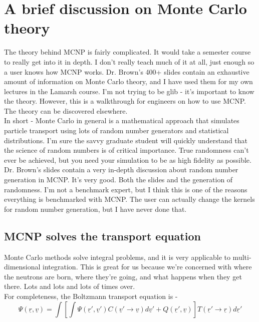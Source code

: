 \documentclass[11pt,a4paper]{article}
\begin{document}
\newpage


\section{A brief discussion on Monte Carlo theory}
\noindent The theory behind MCNP is fairly complicated. It would take a semester course to really get into it in depth. I don't really teach much of it at all, just enough so a user knows how MCNP works. Dr. Brown's 400+ slides contain an exhaustive amount of information on Monte Carlo theory, and I have used them for my own lectures in the Lamarsh course. I'm not trying to be glib - it's important to know the theory. However, this is a walkthrough for engineers on how to use MCNP. The theory can be discovered elsewhere.\\

\noindent In short - Monte Carlo in general is a mathematical approach that simulates particle transport using lots of random number generators and statistical distributions. I'm sure the savvy graduate student will quickly understand that the science of random numbers is of critical importance. True randomness can't ever be achieved, but you need your simulation to be as high fidelity as possible. Dr. Brown's slides contain a very in-depth discussion about random number generation in MCNP. It's
very good. Both the slides and the generation of randomness. I'm not a benchmark expert, but I think this is one of the reasons everything is benchmarked with MCNP. The user can actually change the kernels for random number generation, but I have never done that. 

\subsection{MCNP solves the transport equation}
\noindent Monte Carlo methods solve integral problems, and it is very applicable to multi-dimensional integration. This is great for us because we're concerned with where the neutrons are born, where they're going, and what happens when they get there. Lots and lots and lots of times over. \\

\noindent For completeness, the Boltzmann transport equation is - 
\begin{equation} \label{eq-transport}
    \Psi(\underline{r},\underline{v})=\int[\int\Psi(\underline{r}',\underline{v}')C(\underline{v}'\rightarrow\underline{v})d\underline{v}'+Q(\underline{r}',\underline{v})]T(\underline{r}'\rightarrow\underline{r})d\underline{r}'
\end{equation}
\end{document}
